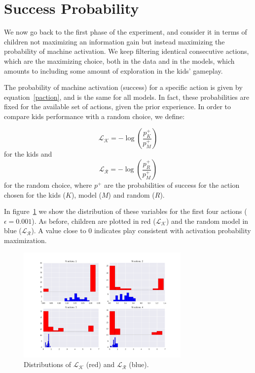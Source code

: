 \documentclass[11pt, a4paper]{article}
\begin{document}
\section*{Success Probability}
We now go back to the first phase of the experiment, and consider it in terms of children not maximizing an information gain but instead maximizing the probability of machine activation. We keep filtering identical consecutive actions, which are the maximizing choice, both in the data and in the models, which amounts to including some amount of exploration in the kids' gameplay.

The probability of machine activation (success) for a specific action is given by equation~\eqref{paction}, and is the same for all models. In fact, these probabilities are fixed for the available set of actions, given the prior experience. In order to compare kids performance with a random choice, we define:

\begin{equation}
\mathcal{L_K}=-\log\left(\frac{p^{+}_K}{p^{+}_M}\right)
\end{equation}
for the kids and
\begin{equation}
\mathcal{L_R}=-\log\left(\frac{p^{+}_R}{p^{+}_M}\right)
\end{equation}
for the random choice, where $p^{+}$ are the probabilities of success for the action chosen for the kids ($K$), model ($M$) and random ($R$). 

In figure~\ref{fig:log_pactivation} we show the distribution of these variables for the first four actions ($\epsilon=0.001$). As before, children are plotted in red ($\mathcal{L_K}$) and the random model in blue ($\mathcal{L_R}$). A value close to 0 indicates play consistent with activation probability maximization. 
 
\begin{figure}[h!]
\begin{center}
\includegraphics[width=0.75\textwidth]{../Plots/log_pactivation.png}
\end{center}
\caption{Distributions of $\mathcal{L_K}$ (red) and $\mathcal{L_R}$ (blue).}
\label{fig:log_pactivation}
\end{figure}
\end{document}
